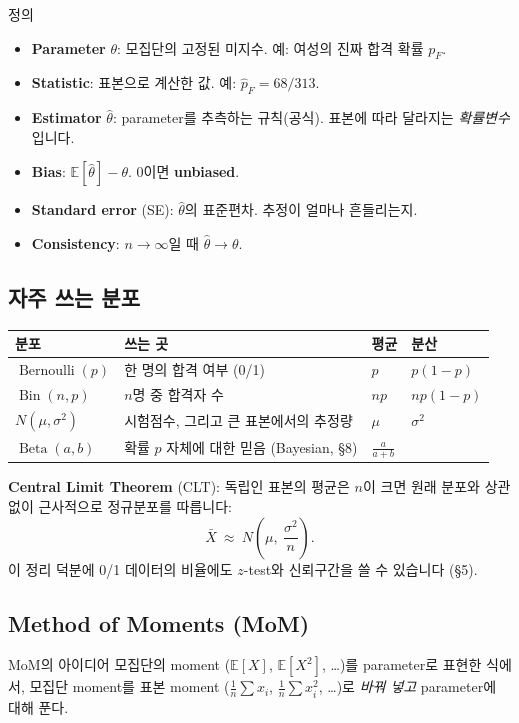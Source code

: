 \documentclass[11pt,a4paper]{article}
\newcommand{\E}{\mathbb{E}}
\newcommand{\Bern}{\operatorname{Bernoulli}}
\newcommand{\Bin}{\operatorname{Bin}}
\newcommand{\BetaD}{\operatorname{Beta}}
\newcommand{\term}[1]{\textbf{#1}}
\begin{document}
\begin{defbox}{정의}
\begin{itemize}
\item \term{Parameter} $\theta$: 모집단의 고정된 미지수. 예: 여성의 진짜 합격 확률 $p_F$.
\item \term{Statistic}: 표본으로 계산한 값. 예: $\hat p_F=68/313$.
\item \term{Estimator} $\hat\theta$: parameter를 추측하는 규칙(공식). 표본에 따라 달라지는 \emph{확률변수}입니다.
\item \term{Bias}: $\E[\hat\theta]-\theta$. 0이면 \term{unbiased}.
\item \term{Standard error} (SE): $\hat\theta$의 표준편차. 추정이 얼마나 흔들리는지.
\item \term{Consistency}: $n\to\infty$일 때 $\hat\theta\to\theta$.
\end{itemize}
\end{defbox}

\subsection{자주 쓰는 분포}
\begin{center}
\begin{tabular}{@{}l l l l@{}}
\toprule
분포 & 쓰는 곳 & 평균 & 분산 \\
\midrule
$\Bern(p)$ & 한 명의 합격 여부 (0/1) & $p$ & $p(1-p)$ \\
$\Bin(n,p)$ & $n$명 중 합격자 수 & $np$ & $np(1-p)$ \\
$N(\mu,\sigma^2)$ & 시험점수, 그리고 큰 표본에서의 추정량 & $\mu$ & $\sigma^2$ \\
$\BetaD(a,b)$ & 확률 $p$ 자체에 대한 믿음 (Bayesian, \S8) & $\frac{a}{a+b}$ & \\
\bottomrule
\end{tabular}
\end{center}

\term{Central Limit Theorem} (CLT): 독립인 표본의 평균은 $n$이 크면 원래 분포와 상관없이 근사적으로 정규분포를 따릅니다:
\[
\bar X\ \approx\ N\!\left(\mu,\ \frac{\sigma^2}{n}\right).
\]
이 정리 덕분에 0/1 데이터의 비율에도 $z$-test와 신뢰구간을 쓸 수 있습니다 (\S5).

\subsection{Method of Moments (MoM)}
\begin{defbox}{MoM의 아이디어}
모집단의 moment ($\E[X]$, $\E[X^2]$, \dots)를 parameter로 표현한 식에서, 모집단 moment를 표본 moment ($\frac1n\sum x_i$, $\frac1n\sum x_i^2$, \dots)로 \emph{바꿔 넣고} parameter에 대해 푼다.
\end{defbox}
\end{document}
